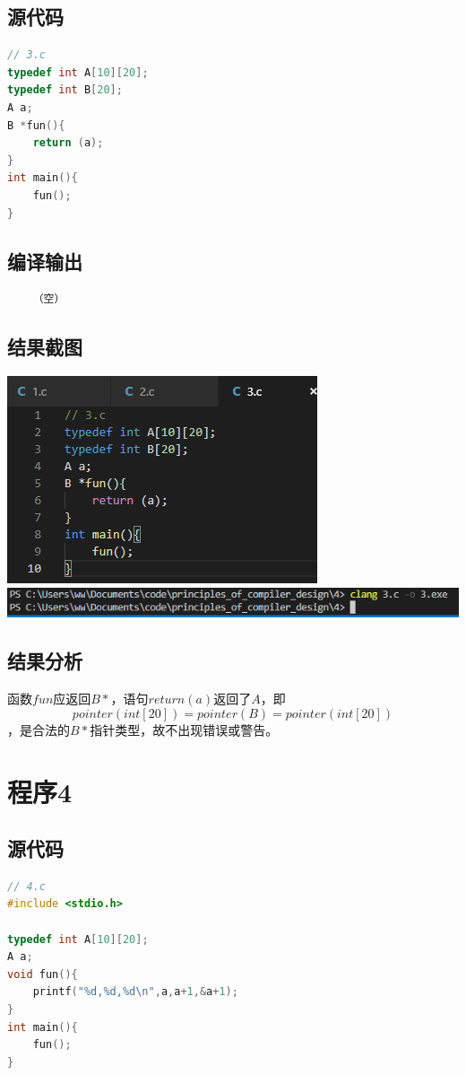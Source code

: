 \documentclass[UTF8]{ctexart}
\begin{document}
\subsection{源代码}
\begin{lstlisting}[language={C}]
// 3.c
typedef int A[10][20];
typedef int B[20];
A a;
B *fun(){
    return (a);
}
int main(){
    fun();
}
    \end{lstlisting}
\subsection{编译输出}
\begin{lstlisting}
    （空）
    \end{lstlisting}
\subsection{结果截图}
\includegraphics{3-code} \\
\includegraphics[width=\textwidth]{3-output}
\subsection{结果分析}
函数$fun$应返回$B*$，语句$return (a)$返回了$A$，即
$$pointer(int[20]) = pointer(B) = pointer(int[20])$$
，是合法的$B*$指针类型，故不出现错误或警告。
\section{程序4}
\subsection{源代码}
\begin{lstlisting}[language={C}]
// 4.c
#include <stdio.h>

typedef int A[10][20];
A a;
void fun(){
    printf("%d,%d,%d\n",a,a+1,&a+1);
}
int main(){
    fun();
}
    \end{lstlisting}
\end{document}
